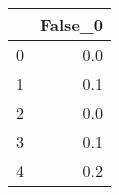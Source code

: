 \begin{tabular}{lr}
\toprule
{} &  False\_0 \\ \hline
\midrule
0 &      0.0 \\ \hline
1 &      0.1 \\ \hline
2 &      0.0 \\ \hline
3 &      0.1 \\ \hline
4 &      0.2 \\ \hline
\bottomrule
\end{tabular}
